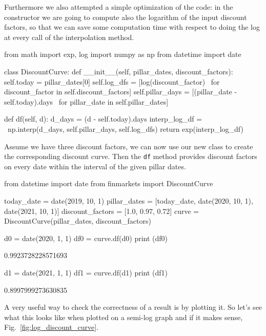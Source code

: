 Furthermore we also attempted a simple optimization of the code: in the constructor we are going to compute also the logarithm of the input discount factors, so that we can save some computation time with respect to doing the log at every call of the interpolation method. 

\begin{ipython}
from math import exp, log
import numpy as np
from datetime import date

class DiscountCurve:
    def __init__(self, pillar_dates, discount_factors):
        self.today = pillar_dates[0]
        self.log_dfs = [log(discount_factor) \
            for discount_factor in self.discount_factors]
        self.pillar_days = [(pillar_date - self.today).days \
            for pillar_date in self.pillar_dates]

    def df(self, d):
        d_days = (d - self.today).days
        interp_log_df = \
            np.interp(d_days, self.pillar_days, self.log_dfs)
        return exp(interp_log_df)
\end{ipython}

Assume we have three discount factors, we can now use our new class to create the corresponding discount curve. Then the \texttt{df} method provides discount factors on every date within the interval of the given pillar dates.

\begin{ipython}
from datetime import date
from finmarkets import DiscountCurve

today_date = date(2019, 10, 1)
pillar_dates = [today_date, date(2020, 10, 1), date(2021, 10, 1)]
discount_factors = [1.0, 0.97, 0.72]
curve = DiscountCurve(pillar_dates, discount_factors)

d0 = date(2020, 1, 1)
df0 = curve.df(d0)
print (df0)
\end{ipython}
\begin{ioutput}
0.9923728228571693
\end{ioutput}

\begin{ipython}
d1 = date(2021, 1, 1)
df1 = curve.df(d1)
print (df1)
\end{ipython}
\begin{ioutput}
0.8997999273630835
\end{ioutput}

A very useful way to check the correctness of a result is by plotting it. So let's see what this looks like when plotted on a semi-log graph and if it makes sense, Fig.~\ref{fig:log_discount_curve}.

